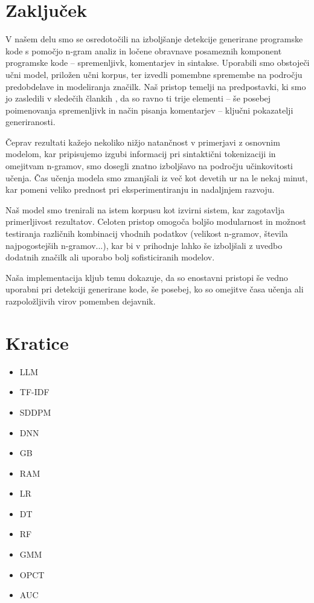 \documentclass[sigconf,nonacm]{acmart}
\begin{document}
\section{Zaključek}
V našem delu smo se osredotočili na izboljšanje detekcije generirane programske kode s pomočjo n-gram analiz in ločene obravnave posameznih komponent programske kode – spremenljivk, komentarjev in sintakse. Uporabili smo obstoječi učni model, priložen učni korpus, ter izvedli pomembne spremembe na področju predobdelave in modeliranja značilk. Naš pristop temelji na predpostavki, ki smo jo zasledili v sledečih člankih \cite{oedingen2024chatgpt, xu2024distinguishing, gurioli2024you}, da so ravno ti trije elementi – še posebej poimenovanja spremenljivk in način pisanja komentarjev – ključni pokazatelji generiranosti.

Čeprav rezultati kažejo nekoliko nižjo natančnost v primerjavi z osnovnim modelom, kar pripisujemo izgubi informacij pri sintaktični tokenizaciji in omejitvam n-gramov, smo dosegli znatno izboljšavo na področju učinkovitosti učenja. Čas učenja modela smo zmanjšali iz več kot devetih ur na le nekaj minut, kar pomeni veliko prednost pri eksperimentiranju in nadaljnjem razvoju.

Naš model smo trenirali na istem korpusu kot izvirni sistem, kar zagotavlja primerljivost rezultatov. Celoten pristop omogoča boljšo modularnost in možnost testiranja različnih kombinacij vhodnih podatkov (velikost n-gramov, števila najpogostejših n-gramov...), kar bi v prihodnje lahko še izboljšali z uvedbo dodatnih značilk ali uporabo bolj sofisticiranih modelov.

Naša implementacija kljub temu dokazuje, da so enostavni pristopi še vedno uporabni pri detekciji generirane kode, še posebej, ko so omejitve časa učenja ali razpoložljivih virov pomemben dejavnik.

\section*{Kratice}
\begin{itemize}
	\item \acrfull{LLM}
	\item \acrfull{TF-IDF}
	\item \acrfull{SDDPM}
	\item \acrfull{DNN}
	\item \acrfull{GB}
	\item \acrfull{RAM}
	\item \acrfull{LR}
	\item \acrfull{DT}
	\item \acrfull{RF}
	\item \acrfull{GMM}
	\item \acrfull{OPCT}
	\item \acrfull{AUC}
\end{itemize}

\renewcommand\refname{Literatura} 


\end{document}
